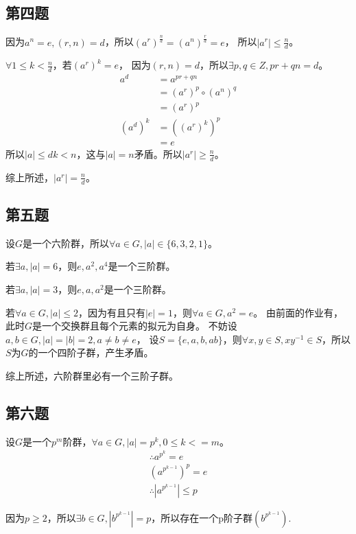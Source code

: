 \documentclass[12pt,onecolumn]{article}
\theoremstyle{plain}
\begin{document}
\subsection{第四题}
\begin{proof*}
  因为$a^n = e, (r, n) = d$，所以${(a^r)}^\frac{n}{d} = {(a^n)}^\frac{r}{d} = e$，
  所以$|a^r| \leq \frac{n}{d}$。

  $\forall 1 \leq k < \frac{n}{d}$，若${(a^r)}^k = e$，
  因为$(r, n) = d$，所以$\exists p, q \in Z, pr + qn = d$。
  \begin{align*}
    a^d &= a^{pr + qn} \\
        &= {(a^r)}^p \circ {(a^n)}^q \\
        &= {(a^r)}^p \\
    {(a^d)}^k &= {({(a^r)}^k)}^p \\
        &= e
  \end{align*}
  所以$|a| \leq dk < n$，这与$|a| = n$矛盾。所以$|a^r| \geq \frac{n}{d}$。

  综上所述，$|a^r| = \frac{n}{d}$。
\end{proof*}

\subsection{第五题}
\begin{proof*}
  设$G$是一个六阶群，所以$\forall a \in G, |a| \in \{6, 3, 2, 1\}$。

  若$\exists a, |a| = 6$，则${e, a^2, a^4}$是一个三阶群。

  若$\exists a, |a| = 3$，则${e, a, a^2}$是一个三阶群。

  若$\forall a \in G, |a| \leq 2$，因为有且只有$|e| = 1$，则$\forall a \in G, a^2 = e$。
  由前面的作业有，此时$G$是一个交换群且每个元素的拟元为自身。
  不妨设$a, b \in G, |a| = |b| = 2, a \neq b \neq e$，
  设$S = \{e, a, b, ab\}$，则$\forall x, y \in S, xy^{-1} \in S$，所以$S$为$G$的一个四阶子群，产生矛盾。

  综上所述，六阶群里必有一个三阶子群。
\end{proof*}

\subsection{第六题}
\begin{proof*}
  设$G$是一个$p^m$阶群，$\forall a \in G, |a| = p^k, 0 \leq k <= m$。
  \begin{gather*}
    \therefore a^{p^k} = e \\
    {(a^{p^{k - 1}})}^p = e \\
    \therefore |a^{p^{k - 1}}| \leq p
  \end{gather*}

  因为$p \geq 2$，所以$\exists b \in G, |b^{p^{k - 1}}| = p$，所以存在一个p阶子群$(b^{p^{k - 1}})$.
\end{proof*}
\end{document}

